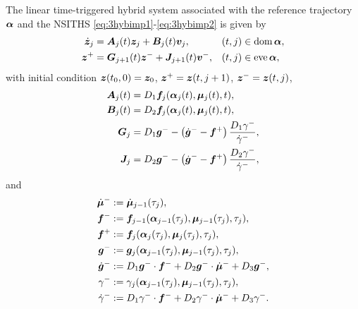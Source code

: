 \documentclass[../DC2019003Bouma.tex]{subfiles}
\begin{document}
\begin{sloppypar}
\begin{mydef}[LTTHS]\label{def:3ltths}
The linear time-triggered hybrid system associated with the reference trajectory $\alphab$ and the NSITHS \eqref{eq:3hybimp1}-\eqref{eq:3hybimp2} is given by
\begin{align}
\dot{\zb}_j &= \Ab_j(t)\zb_j + \Bb_j(t)\vb_j, &(t,j)&\in \dom\alphab,\\
\zb^+ &= \Gb_{j+1}(t)\zb^- + \Jb_{j+1}(t)\vb^-, &(t,j)&\in \eve\alphab,
\end{align}
with initial condition $\zb(t_0,0)=\zb_0$, $\zb^+ = \zb(t,j+1)$, $\zb^- = \zb(t,j)$,
\begin{align*}
\Ab_j(t) &= D_1\fb_j(\alphab_j(t),\mub_j(t),t),\\
\Bb_j(t) &= D_2\fb_j(\alphab_j(t),\mub_j(t),t),\\
\Gb_j &= D_1\gb^- - \left(\dot{\gb}^- - \fb^+\right)\frac{D_1\gamma^-}{\dot{\gamma}^-},\\
\Jb_j &= D_2\gb^- - \left(\dot{\gb}^- - \fb^+\right)\frac{D_2\gamma^-}{\dot{\gamma}^-},
\end{align*}
and
\begin{align*}
\dot{\mub}^- &:= \dot{\mub}_{j-1}(\tau_j),\\
\fb^- &:= \fb_{j-1}(\alphab_{j-1}(\tau_j),\mub_{j-1}(\tau_j),\tau_j),\\
\fb^+ &:= \fb_j(\alphab_j(\tau_j),\mub_j(\tau_j),\tau_j),\\
\gb^- &:= \gb_{j}(\alphab_{j-1}(\tau_j),\mub_{j-1}(\tau_j),\tau_j),\\
\dot{\gb}^- &:= D_1\gb^-\cdot \fb^- + D_2\gb^-\cdot \dot{\mub}^- + D_3\gb^-,\\
\gamma^- &:= \gamma_j(\alphab_{j-1}(\tau_j),\mub_{j-1}(\tau_j),\tau_j),\\
\dot{\gamma}^- &:= D_1\gamma^-\cdot\fb^- + D_2\gamma^-\cdot\dot{\mub}^- + D_3\gamma^-.
\end{align*}
\end{mydef}
\end{sloppypar}
\end{document}
